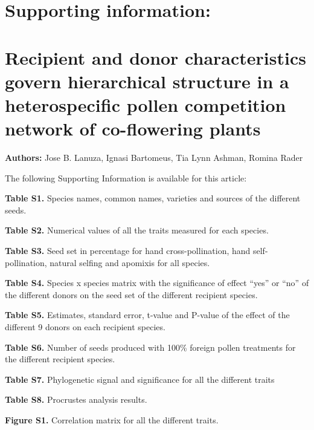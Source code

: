 \documentclass[
  12pt,
]{article}
\author{}
\date{\vspace{-2.5em}}
\begin{document}
\captionsetup[figure]{labelformat=empty}
\captionsetup[table]{labelformat=empty}
\renewcommand{\figurename}{}

\hypertarget{supporting-information}{%
\section{Supporting information:}\label{supporting-information}}

\hypertarget{recipient-and-donor-characteristics-govern-hierarchical-structure-in-a-heterospecific-pollen-competition-network-of-co-flowering-plants}{%
\section{Recipient and donor characteristics govern hierarchical
structure in a heterospecific pollen competition network of co-flowering
plants}\label{recipient-and-donor-characteristics-govern-hierarchical-structure-in-a-heterospecific-pollen-competition-network-of-co-flowering-plants}}

\textbf{Authors:} Jose B. Lanuza, Ignasi Bartomeus, Tia Lynn Ashman,
Romina Rader

The following Supporting Information is available for this article:

\textbf{Table S1.} Species names, common names, varieties and sources of
the different seeds.

\textbf{Table S2.} Numerical values of all the traits measured for each
species.

\textbf{Table S3.} Seed set in percentage for hand cross-pollination,
hand self-pollination, natural selfing and apomixis for all species.

\textbf{Table S4.} Species x species matrix with the significance of
effect ``yes'' or ``no'' of the different donors on the seed set of the
different recipient species.

\textbf{Table S5.} Estimates, standard error, t-value and P-value of the
effect of the different 9 donors on each recipient species.

\textbf{Table S6.} Number of seeds produced with 100\% foreign pollen
treatments for the different recipient species.

\textbf{Table S7.} Phylogenetic signal and significance for all the
different traits

\textbf{Table S8.} Procrustes analysis results.

\textbf{Figure S1.} Correlation matrix for all the different traits.
\end{document}
